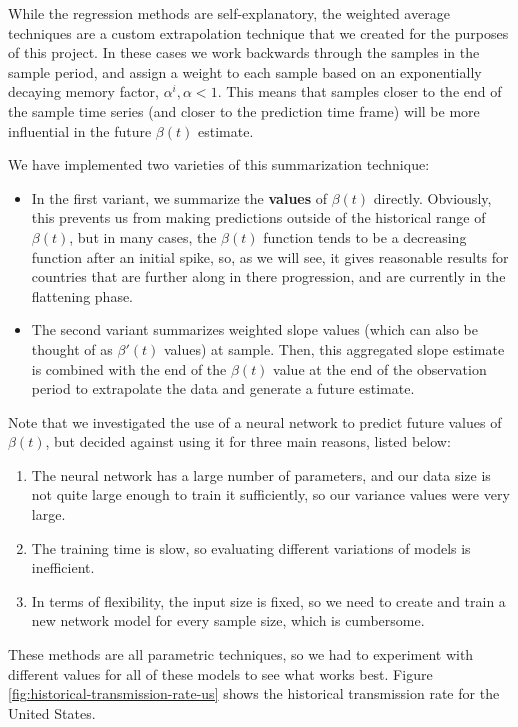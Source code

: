 \documentclass[11pt]{article}
\begin{document}
While the regression methods are self-explanatory, the weighted average techniques are a custom extrapolation technique that we created for the purposes of this project. In these cases we work backwards through the samples in the sample period, and assign a weight to each sample based on an exponentially decaying memory factor, $\alpha^i, \alpha < 1$. This means that samples closer to the end of the sample time series (and closer to the prediction time frame) will be more influential in the future $\beta(t)$ estimate.

We have implemented two varieties of this summarization technique:
\begin{itemize}
    \item In the first variant, we summarize the \textbf{values} of $\beta(t)$ directly. Obviously, this prevents us from making predictions outside of the historical range of $\beta(t)$, but in many cases, the $\beta(t)$ function tends to be a decreasing function after an initial spike, so, as we will see, it gives reasonable results for countries that are further along in there progression, and are currently in the flattening phase.
    \item The second variant summarizes weighted slope values (which can also be thought of as $\beta'(t)$ values) at sample. Then, this aggregated slope estimate is combined with the end of the $\beta(t)$ value at the end of the observation period to extrapolate the data and generate a future estimate.
\end{itemize}

Note that we investigated the use of a neural network to predict future values of $\beta(t)$, but decided against using it for three main reasons, listed below:
\begin{enumerate}
    \item The neural network has a large number of parameters, and our data size is not quite large enough to train it sufficiently, so our variance values were very large.
    \item The training time is slow, so evaluating different variations of models is inefficient.
    \item In terms of flexibility, the input size is fixed, so we need to create and train a new network model for every sample size, which is cumbersome.
\end{enumerate}

These methods are all parametric techniques, so we had to experiment with different values for all of these models to see what works best. Figure \ref{fig:historical-transmission-rate-us} shows the historical transmission rate for the United States.
\end{document}
